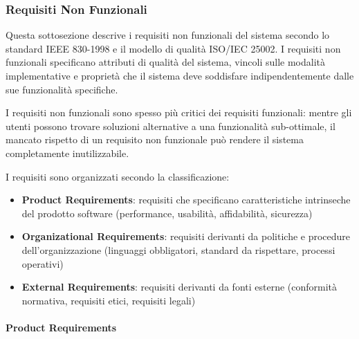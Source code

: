 \subsubsection{Requisiti Non Funzionali}
\label{subsec:requisiti-non-funzionali}

Questa sottosezione descrive i requisiti non funzionali del sistema \productname{} secondo lo standard IEEE 830-1998 e il modello di qualità ISO/IEC 25002. I requisiti non funzionali specificano attributi di qualità del sistema, vincoli sulle modalità implementative e proprietà che il sistema deve soddisfare indipendentemente dalle sue funzionalità specifiche.

\vspace{0.3cm}

I requisiti non funzionali sono spesso più critici dei requisiti funzionali: mentre gli utenti possono trovare soluzioni alternative a una funzionalità sub-ottimale, il mancato rispetto di un requisito non funzionale può rendere il sistema completamente inutilizzabile.

\vspace{0.3cm}

I requisiti sono organizzati secondo la classificazione:

\begin{itemize}[leftmargin=1.1em]
\item \textbf{Product Requirements}: requisiti che specificano caratteristiche intrinseche del prodotto software (performance, usabilità, affidabilità, sicurezza)
\item \textbf{Organizational Requirements}: requisiti derivanti da politiche e procedure dell'organizzazione (linguaggi obbligatori, standard da rispettare, processi operativi)
\item \textbf{External Requirements}: requisiti derivanti da fonti esterne (conformità normativa, requisiti etici, requisiti legali)
\end{itemize}


\paragraph{Product Requirements}
\label{subsubsec:product-requirements}


